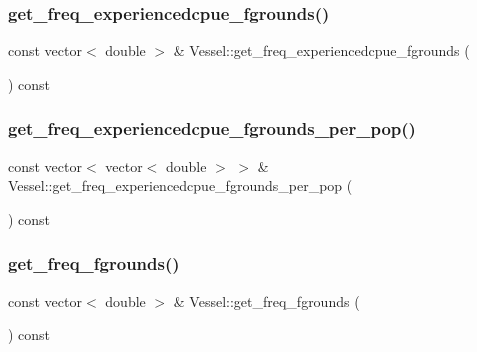 \mbox{\label{class_vessel_aa3f3c243856abffe99ac98f287037304}} 
\subsubsection{\texorpdfstring{get\_freq\_experiencedcpue\_fgrounds()}{get\_freq\_experiencedcpue\_fgrounds()}}
{\footnotesize\ttfamily const vector$<$ double $>$ \& Vessel\+::get\+\_\+freq\+\_\+experiencedcpue\+\_\+fgrounds (\begin{DoxyParamCaption}{ }\end{DoxyParamCaption}) const}

\mbox{\label{class_vessel_ae60016470cb4f11299d23f0b11398b1d}} 
\subsubsection{\texorpdfstring{get\_freq\_experiencedcpue\_fgrounds\_per\_pop()}{get\_freq\_experiencedcpue\_fgrounds\_per\_pop()}}
{\footnotesize\ttfamily const vector$<$ vector$<$ double $>$ $>$ \& Vessel\+::get\+\_\+freq\+\_\+experiencedcpue\+\_\+fgrounds\+\_\+per\+\_\+pop (\begin{DoxyParamCaption}{ }\end{DoxyParamCaption}) const}

\mbox{\label{class_vessel_ad7da25eb462ba212f75289c25b4bfcc4}} 
\subsubsection{\texorpdfstring{get\_freq\_fgrounds()}{get\_freq\_fgrounds()}}
{\footnotesize\ttfamily const vector$<$ double $>$ \& Vessel\+::get\+\_\+freq\+\_\+fgrounds (\begin{DoxyParamCaption}{ }\end{DoxyParamCaption}) const}


